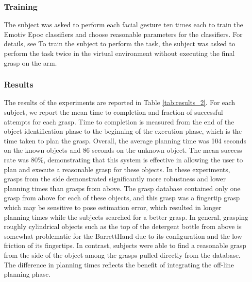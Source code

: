 \subsubsection{Training}
\label{sec:emotiv_training}
The subject was asked to perform each facial gesture ten times each to train the Emotiv Epoc classifiers and choose reasonable parameters for the classifiers. For details, see \cite{Weisz2013} To train the subject to perform the task, the subject was asked to perform the task twice in the virtual environment without executing the final grasp on the arm. 

\subsubsection{Results}
The results of the experiments are reported in Table \ref{tab:results_2}. For each subject, we report the mean time to completion and fraction of successful attempts for each grasp. Time to completion is measured from the end of the object identification phase to the beginning of the execution phase, which is the time taken to plan the grasp. Overall, the average planning time was 104 seconds on the known objects and 86 seconds on the unknown object. The mean success rate was 80\%, demonstrating that this system is effective in allowing the user to plan and execute a reasonable grasp for these objects.
In these experiments, grasps from the side demonstrated significantly more robustness and lower planning times than grasps from above. The grasp database contained only one grasp from above for each of these objects, and this grasp was a fingertip grasp which may be sensitive to pose estimation error, which resulted in longer planning times while the subjects searched for a better grasp. In general, grasping roughly cylindrical objects such as the top of the detergent bottle from above is somewhat problematic for the BarrettHand due to its configuration and the low friction of its fingertips. In contrast, subjects were able to find a reasonable grasp from the side of the object among the grasps pulled directly from the database. The difference in planning times reflects the benefit of integrating the off-line planning phase.

